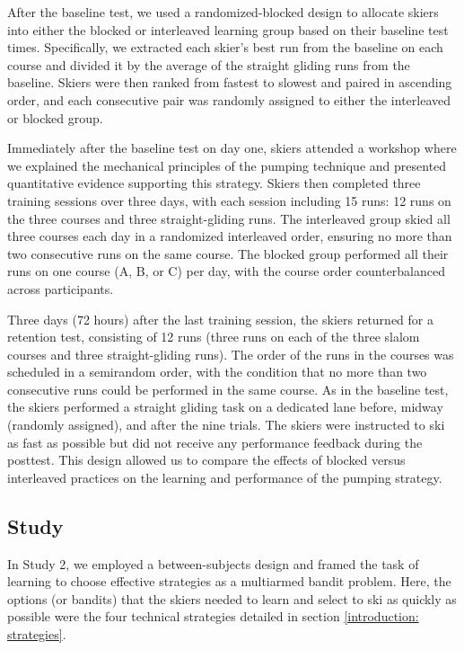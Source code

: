 After the baseline test, we used a randomized-blocked design to allocate skiers into either the blocked or interleaved learning group based on their baseline test times. Specifically, we extracted each skier's best run from the baseline on each course and divided it by the average of the straight gliding runs from the baseline. Skiers were then ranked from fastest to slowest and paired in ascending order, and each consecutive pair was randomly assigned to either the interleaved or blocked group.

Immediately after the baseline test on day one, skiers attended a workshop where we explained the mechanical principles of the pumping technique and presented quantitative evidence supporting this strategy. Skiers then completed three training sessions over three days, with each session including 15 runs: 12 runs on the three courses and three straight-gliding runs. The interleaved group skied all three courses each day in a randomized interleaved order, ensuring no more than two consecutive runs on the same course. The blocked group performed all their runs on one course (A, B, or C) per day, with the course order counterbalanced across participants. 

Three days (72 hours) after the last training session, the skiers returned for a retention test, consisting of 12 runs (three runs on each of the three slalom courses and three straight-gliding runs). The order of the runs in the courses was scheduled in a semirandom order, with the condition that no more than two consecutive runs could be performed in the same course. As in the baseline test, the skiers performed a straight gliding task on a dedicated lane before, midway (randomly assigned), and after the nine trials. The skiers were instructed to ski as fast as possible but did not receive any performance feedback during the posttest. This design allowed us to compare the effects of blocked versus interleaved practices on the learning and performance of the pumping strategy. 


\subsection{Study }
In Study 2, we employed a between-subjects design and framed the task of learning to choose effective strategies as a multiarmed bandit problem\cite{sutton_reinforcement_2018}. Here, the options (or bandits) that the skiers needed to learn and select to ski as quickly as possible were the four technical strategies detailed in section \ref{introduction: strategies}.

